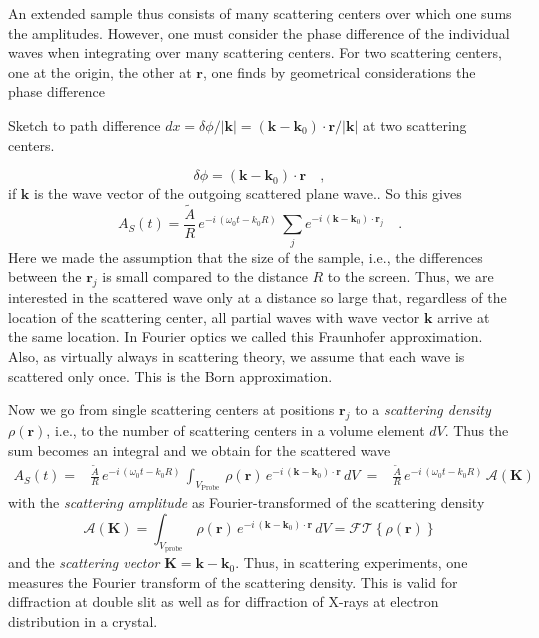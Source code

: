 An extended sample thus consists of many scattering centers over which one sums the amplitudes. However, one must consider the phase difference of the individual waves when integrating over many scattering centers. For two scattering centers, one at the origin, the other at $\mathbf{r}$, one finds by geometrical considerations the phase difference
%
\begin{marginfigure}
\caption{Sketch to path difference $dx = \delta \phi / | \mathbf{k}|= ( \mathbf{k} - \mathbf{k}_0 ) \cdot \mathbf{r} / |\mathbf{k}| $ at two scattering centers.}
\end{marginfigure}
%
\begin{equation}
\delta \phi = ( \mathbf{k} - \mathbf{k}_0 ) \cdot \mathbf{r} \quad ,
\end{equation}
if $\mathbf{k}$ is the wave vector of the outgoing scattered plane wave.. So this gives
\begin{equation}
  A_S(t) = \frac{\tilde{A}}{R} \, e^{- i \, (\omega_0 t - k_0 R)} \,
  \sum_j e^{- i \, ( \mathbf{k} - \mathbf{k}_0 ) \cdot \mathbf{r}_j} \quad .
\end{equation}
Here we made the assumption that the size of the sample, i.e., the differences between the $\mathbf{r}_j$ is small compared to the distance $R$ to the screen. Thus, we are interested in the scattered wave only at a distance so large that, regardless of the location of the scattering center, all partial waves with wave vector $\mathbf{k}$ arrive at the same location. In Fourier optics we called this Fraunhofer approximation. Also, as virtually always in scattering theory, we assume that each wave is scattered only once. This is the Born approximation. 

Now we go from single scattering centers at positions $\mathbf{r}_j$ to a \emph{scattering density} $\rho(\mathbf{r})$, i.e., to the number of scattering centers in a volume element $dV$. Thus the sum becomes an integral and we obtain for the scattered wave
\begin{align}
 A_S(t) = & \frac{\tilde{A}}{R} \, e^{- i \, (\omega_0 t - k_0 R)} \,
  \int_{V_\text{Probe}} \, \rho( \mathbf{r}) \, e^{- i \, ( \mathbf{k} - \mathbf{k}_0 ) \cdot \mathbf{r}} \, dV \
  = & \frac{\tilde{A}}{R} \, e^{- i \, (\omega_0 t - k_0 R)} \, \mathcal{A}(\mathbf{K}) 
\end{align}
with the \emph{scattering amplitude} as Fourier-transformed of the scattering density
\begin{equation}
\mathcal{A}(\mathbf{K}) = \int_{V_\text{probe}} \, \rho( \mathbf{r}) \, e^{- i \, ( \mathbf{k} - \mathbf{k}_0 ) \cdot \mathbf{r}} \, dV = \mathcal{FT} \left\{ \rho( \mathbf{r}) \right\} \label{eq:4_scattering_amplitude}
\end{equation}
and the \emph{scattering vector} $\mathbf{K} = \mathbf{k} - \mathbf{k}_0$. Thus, in scattering experiments, one measures the Fourier transform of the scattering density. This is valid for diffraction at double slit as well as for diffraction of X-rays at electron distribution in a crystal. 



